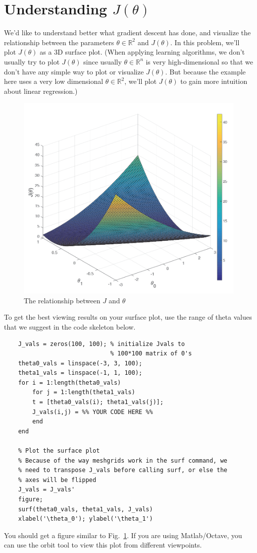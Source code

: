 \documentclass[10pt,a4paper]{article}
\begin{document}
  


\section{Understanding $J(\theta)$}
%
  We'd like to understand better what gradient descent has done, and visualize the relationship between the parameters  $\theta \in {\mathbb R}^2$ and $J(\theta)$. In this problem, we'll plot $J(\theta)$ as a 3D surface plot. (When applying learning algorithms, we don't usually try to plot $J(\theta)$ since usually  $\theta \in {\mathbb R}^n$ is very high-dimensional so that we don't have any simple way to plot or visualize $J(\theta)$. But because the example here uses a very low dimensional  $\theta \in {\mathbb R}^2$, we'll plot $J(\theta)$ to gain more intuition about linear regression.)

  \begin{figure}[htb!]
    \centering
      \includegraphics[width=.6\columnwidth]{surface.png}
      \caption{The relationship between $J$ and $\theta$}
      \label{fig:surf}
  \end{figure}

  To get the best viewing results on your surface plot, use the range of theta values that we suggest in the code skeleton below.
  \begin{lstlisting}
    J_vals = zeros(100, 100); % initialize Jvals to
                              % 100*100 matrix of 0's
    theta0_vals = linspace(-3, 3, 100);
    theta1_vals = linspace(-1, 1, 100);
    for i = 1:length(theta0_vals)
        for j = 1:length(theta1_vals)
        t = [theta0_vals(i); theta1_vals(j)];
        J_vals(i,j) = %% YOUR CODE HERE %%
        end
    end

    % Plot the surface plot
    % Because of the way meshgrids work in the surf command, we 
    % need to transpose J_vals before calling surf, or else the 
    % axes will be flipped
    J_vals = J_vals'
    figure;
    surf(theta0_vals, theta1_vals, J_vals)
    xlabel('\theta_0'); ylabel('\theta_1')
  \end{lstlisting}
  You should get a figure similar to Fig.~\ref{fig:surf}. If you are using Matlab/Octave, you can use the orbit tool to view this plot from different viewpoints.
  
\end{document}
